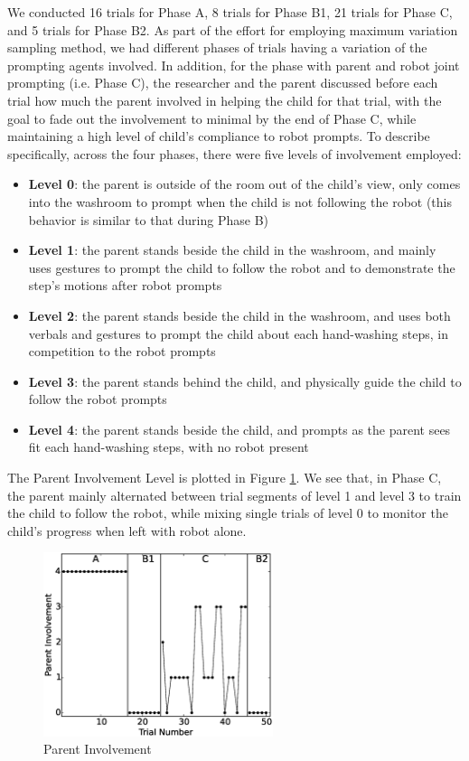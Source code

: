 We conducted 16 trials for Phase A, 8 trials for Phase B1, 21 trials for Phase C, and 5 trials for Phase B2.  As part of the effort for employing maximum variation sampling method, we had different phases of trials having a variation of the prompting agents involved.  In addition, for the phase with parent and robot joint prompting (i.e. Phase C), the researcher and the parent discussed before each trial how much the parent involved in helping the child for that trial, with the goal to fade out the involvement to minimal by the end of Phase C, while maintaining a high level of child's compliance to robot prompts.  To describe specifically, across the four phases, there were five levels of involvement employed:
\begin{itemize}
	\item \textbf{Level 0}: the parent is outside of the room out of the child's view, only comes into the washroom to prompt when the child is not following the robot (this behavior is similar to that during Phase B)
	\item \textbf{Level 1}: the parent stands beside the child in the washroom, and mainly uses gestures to prompt the child to follow the robot and to demonstrate the step's motions after robot prompts
	\item \textbf{Level 2}: the parent stands beside the child in the washroom, and uses both verbals and gestures to prompt the child about each hand-washing steps, in competition to the robot prompts
	\item \textbf{Level 3}: the parent stands behind the child, and physically guide the child to follow the robot prompts
	\item \textbf{Level 4}: the parent stands beside the child, and prompts as the parent sees fit each hand-washing steps, with no robot present
\end{itemize}
The Parent Involvement Level is plotted in Figure \ref{fig:6ParentInvolvement}.  We see that, in Phase C, the parent mainly alternated between trial segments of level 1 and level 3 to train the child to follow the robot, while mixing single trials of level 0 to monitor the child's progress when left with robot alone.
\begin{figure} [h]
	\centering
	\includegraphics[width=0.6\textwidth]{./img/data_analysis/6ParentInvolvement.eps}
	\caption{Parent Involvement}
	\label{fig:6ParentInvolvement}
\end{figure}

